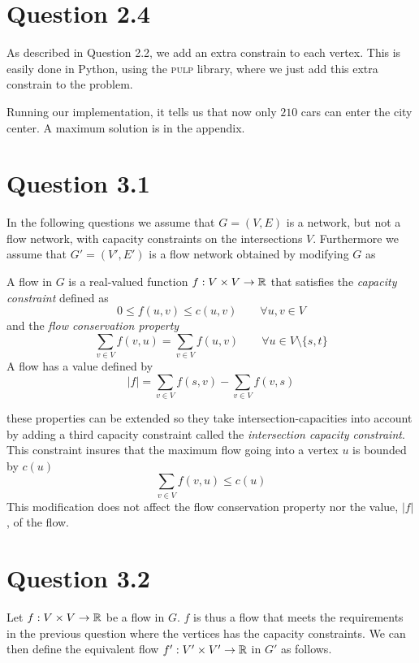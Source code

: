 \documentclass[10pt]{article}
\begin{document}
\section*{Question 2.4} %
\label{sec:question_2_4}
As described in Question 2.2, we add an extra constrain to each vertex.
This is easily done in Python, using the \textsc{pulp} library, where we just add this extra constrain to the problem.

Running our implementation, it tells us that now only $210$ cars can enter the city center.
A maximum solution is in the appendix.


\section*{Question 3.1} %
\label{sec:question_3_1}
In the following questions we assume that $G = (V,E)$ is a network, but not a flow network, with capacity constraints on the intersections $V$. Furthermore we assume that $G' = (V',E')$ is a flow network obtained by modifying $G$ as 

A flow in $G$ is a real-valued function $f: V \times V \rightarrow \mathbb R$ that satisfies the \emph{capacity constraint} defined as
\begin{equation}
 0 \leq f(u,v) \leq c(u,v) \qquad  \forall u,v \in V
\end{equation}
and the \emph{flow conservation property}
\begin{equation}
\sum_{v \in V} f(v,u) = \sum_{v \in V} f(u,v)  \qquad \forall u \in V \setminus \{s,t\}
\end{equation}
A flow has a value defined by
\begin{equation}
 |f| = \sum_{v \in V} f(s,v) - \sum_{v \in V} f(v,s)
\end{equation}

these properties can be extended so they take intersection-capacities into account by adding a third capacity constraint called the \emph{intersection capacity constraint}. This constraint insures that the maximum flow going into a vertex $u$ is bounded by $c(u)$
\begin{equation}
\sum_{v \in V} f(v,u) \leq c(u) 
\end{equation}
This modification does not affect the flow conservation property nor the value, $|f|$, of the flow.


\section*{Question 3.2} %
\label{sec:question_3_2}
Let $f: V \times V \rightarrow \mathbb R$ be a flow in $G$. $f$ is thus a flow that meets the requirements in the previous question where the vertices has the capacity constraints. We can then define the equivalent flow $f': V' \times V' \rightarrow \mathbb R$ in $G'$ as follows. 
\end{document}
